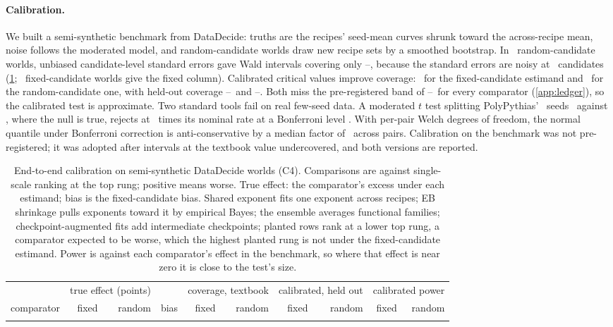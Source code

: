 \documentclass{article}
\begin{document}
\paragraph{Calibration.} We built a semi-synthetic benchmark from DataDecide:
truths are the recipes' seed-mean curves shrunk toward the across-recipe mean,
noise follows the moderated model, and random-candidate worlds draw new recipe
sets by a smoothed bootstrap. In \calRandomWorlds\ random-candidate worlds,
unbiased candidate-level standard errors gave Wald intervals covering only
\calUCovMin--\calUCovMax, because the standard errors are noisy at
\nCandidates\ candidates (\cref{tab:calibration}; \calFixedWorlds\
fixed-candidate worlds give the fixed column).
Calibrated critical
values improve coverage: \calFixedK\ for the fixed-candidate estimand and
\calJackK\ for the random-candidate one, with held-out coverage
\calFixedCovMin--\calFixedCovMax\ and \calJackCovMin--\calJackCovMax. Both
miss the pre-registered band of \calBandLow--\calBandHigh\ for every comparator
(\cref{app:ledger}), so the calibrated test is approximate. Two
standard tools fail on real few-seed data. A moderated $t$ test splitting
PolyPythias' \ppSeeds\ seeds \ppNullSplit\ against \ppNullSplit, where the null
is true, rejects at \nullModBonf\ times its nominal rate at a Bonferroni level
\citep{vanderwal2025polypythias}. With per-pair Welch degrees of freedom, the
normal quantile under Bonferroni correction is anti-conservative by a median
factor of \tRatioMedian\ across pairs. Calibration on the benchmark was not pre-registered;
it was adopted after intervals at the textbook value undercovered, and both
versions are reported.

\begin{table}[t]
\centering
\scriptsize
\begin{tabular}{lrrrrrrrrr}
\toprule
& \multicolumn{2}{c}{true effect (points)} & & \multicolumn{2}{c}{coverage, textbook} & \multicolumn{2}{c}{calibrated, held out} & \multicolumn{2}{c}{calibrated power} \\  %
comparator & fixed & random & bias & fixed & random & fixed & random & fixed & random \\
\midrule
\calibrationRows
\bottomrule
\end{tabular}
\caption{End-to-end calibration on semi-synthetic DataDecide worlds (C4).
Comparisons are against single-scale ranking at the top rung; positive means
worse. True effect: the comparator's excess under each estimand; bias is the
fixed-candidate bias. Shared exponent fits one exponent across recipes; EB
shrinkage pulls exponents toward it by empirical Bayes; the ensemble averages
functional families; checkpoint-augmented fits add intermediate checkpoints;
planted rows rank at a lower top rung, a comparator expected to be worse,
which the highest planted rung is not under the fixed-candidate estimand. Power is against
each comparator's effect in the benchmark, so where that effect is near zero it
is close to the test's size.}
\label{tab:calibration}
\end{table}
\end{document}
